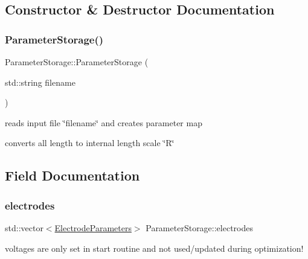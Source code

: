 \subsection{Constructor \& Destructor Documentation}
\mbox{\label{classParameterStorage_a024e6d70a1b33d29e64f72657fb15ba8}} 
\subsubsection{\texorpdfstring{Parameter\+Storage()}{ParameterStorage()}}
{\footnotesize\ttfamily Parameter\+Storage\+::\+Parameter\+Storage (\begin{DoxyParamCaption}\item[{std\+::string}]{filename }\end{DoxyParamCaption})}


\begin{DoxyItemize}
\item reads input file \char`\"{}filename\char`\"{} and creates parameter map
\item converts all length to internal length scale \char`\"{}\+R\char`\"{} 
\end{DoxyItemize}

\subsection{Field Documentation}
\mbox{\label{classParameterStorage_aec3f7cac18829cd67387d9a568547dbf}} 
\subsubsection{\texorpdfstring{electrodes}{electrodes}}
{\footnotesize\ttfamily std\+::vector$<$\hyperlink{structElectrodeParameters}{Electrode\+Parameters}$>$ Parameter\+Storage\+::electrodes}

voltages are only set in start routine and not used/updated during optimization! \mbox{\label{classParameterStorage_ab870128f261ec92df497b10f85cdc9e0}} 
